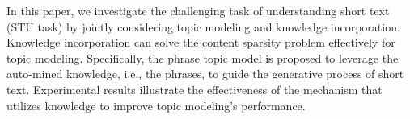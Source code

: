 In this paper, we investigate the challenging task of understanding short text (STU task) by jointly considering topic modeling and knowledge incorporation. Knowledge incorporation can solve the content sparsity problem effectively for topic modeling. Specifically, the phrase topic model is proposed to leverage the auto-mined knowledge, i.e., the phrases, to guide the generative process of short text. Experimental results illustrate the effectiveness of the mechanism that utilizes knowledge to improve topic modeling's performance.
